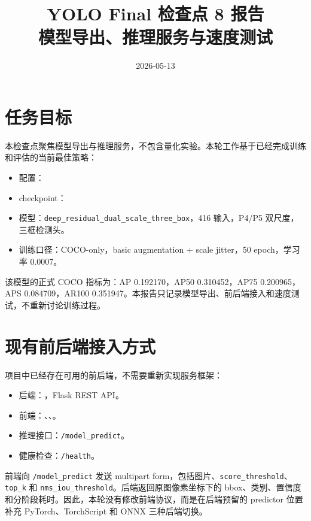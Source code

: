 \documentclass[11pt,a4paper]{article}
\title{YOLO Final 检查点 8 报告\\模型导出、推理服务与速度测试}
\author{}
\date{2026-05-13}
\begin{document}
\maketitle

\section{任务目标}

本检查点聚焦模型导出与推理服务，不包含量化实验。本轮工作基于已经完成训练和评估的当前最佳策略：

\begin{itemize}[leftmargin=2em]
  \item 配置：
  \item checkpoint：
  \item 模型：\texttt{deep\_residual\_dual\_scale\_three\_box}，416 输入，P4/P5 双尺度，三框检测头。
  \item 训练口径：COCO-only，basic augmentation + scale jitter，50 epoch，学习率 0.0007。
\end{itemize}

该模型的正式 COCO 指标为：AP 0.192170，AP50 0.310452，AP75 0.200965，APS 0.084709，AR100 0.351947。本报告只记录模型导出、前后端接入和速度测试，不重新讨论训练过程。

\section{现有前后端接入方式}

项目中已经存在可用的前后端，不需要重新实现服务框架：

\begin{itemize}[leftmargin=2em]
  \item 后端：，Flask REST API。
  \item 前端：、、。
  \item 推理接口：\texttt{/model\_predict}。
  \item 健康检查：\texttt{/health}。
\end{itemize}

前端向 \texttt{/model\_predict} 发送 multipart form，包括图片、\texttt{score\_threshold}、\texttt{top\_k} 和 \texttt{nms\_iou\_threshold}。后端返回原图像素坐标下的 bbox、类别、置信度和分阶段耗时。因此，本轮没有修改前端协议，而是在后端预留的 predictor 位置补充 PyTorch、TorchScript 和 ONNX 三种后端切换。
\end{document}
